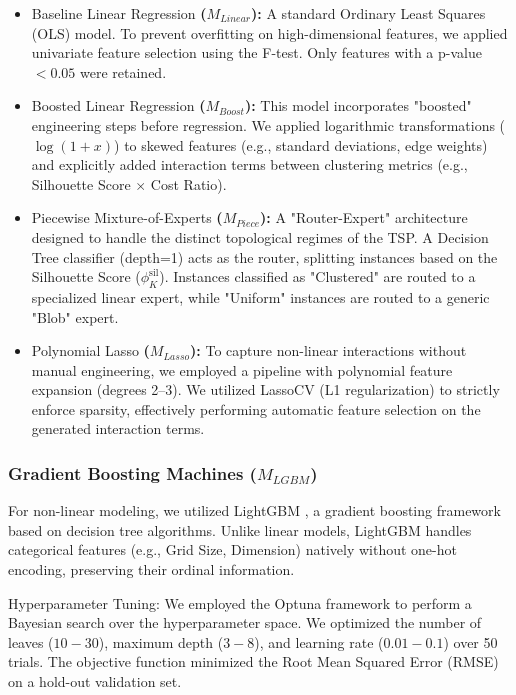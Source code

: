 \documentclass{article}
\begin{document}
\begin{itemize}
    \item Baseline Linear Regression\textbf{ ($M_{Linear}$):} A standard Ordinary Least Squares (OLS) model. To prevent overfitting on high-dimensional features, we applied univariate feature selection using the F-test. Only features with a p-value $< 0.05$ were retained.
    
    \item Boosted Linear Regression\textbf{ ($M_{Boost}$):} This model incorporates "boosted" engineering steps before regression. We applied logarithmic transformations ($\log(1+x)$) to skewed features (e.g., standard deviations, edge weights) and explicitly added interaction terms between clustering metrics (e.g., Silhouette Score $\times$ Cost Ratio). 
    
    \item Piecewise Mixture-of-Experts\textbf{ ($M_{Piece}$):} A "Router-Expert" architecture designed to handle the distinct topological regimes of the TSP. A Decision Tree classifier (depth=1) acts as the router, splitting instances based on the Silhouette Score ($\phi_{K}^{\text{sil}}$). Instances classified as "Clustered" are routed to a specialized linear expert, while "Uniform" instances are routed to a generic "Blob" expert.
    
    \item Polynomial Lasso\textbf{ ($M_{Lasso}$):} To capture non-linear interactions without manual engineering, we employed a pipeline with polynomial feature expansion (degrees 2–3). We utilized LassoCV (L1 regularization) to strictly enforce sparsity, effectively performing automatic feature selection on the generated interaction terms.
\end{itemize}

\subsubsection{Gradient Boosting Machines ($M_{LGBM}$)}
For non-linear modeling, we utilized LightGBM \cite{ke2017lightgbm}, a gradient boosting framework based on decision tree algorithms. Unlike linear models, LightGBM handles categorical features (e.g., Grid Size, Dimension) natively without one-hot encoding, preserving their ordinal information.

Hyperparameter Tuning: We employed the Optuna framework \cite{akiba2019optuna} to perform a Bayesian search over the hyperparameter space. We optimized the number of leaves ($10-30$), maximum depth ($3-8$), and learning rate ($0.01-0.1$) over 50 trials. The objective function minimized the Root Mean Squared Error (RMSE) on a hold-out validation set.
\end{document}
